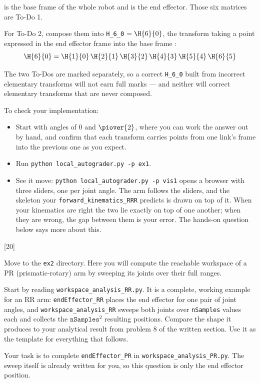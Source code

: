 \documentclass{16384_doc}
\begin{document}
\begin{questions}
 is the base frame of the whole robot and  is the end
effector. Those six matrices are To-Do 1.

For To-Do 2, compose them into \verb!H_6_0! $= \H{6}{0}$, the transform taking a
point expressed in the end effector frame  into the base frame
:
\[
    \H{6}{0} = \H{1}{0}\,\H{2}{1}\,\H{3}{2}\,\H{4}{3}\,\H{5}{4}\,\H{6}{5}
\]

The two To-Dos are marked separately, so a correct \verb!H_6_0! built from
incorrect elementary transforms will not earn full marks --- and neither will
correct elementary transforms that are never composed.

To check your implementation:
\begin{itemize}
    \item Start with angles of $0$ and $\piover{2}$, where you can work the
        answer out by hand, and confirm that each transform carries points from
        one link's frame into the previous one as you expect.
    \item Run \verb!python local_autograder.py -p ex1!.
    \item See it move: \verb!python local_autograder.py -p vis1! opens a browser
        with three sliders, one per joint angle. The arm follows the sliders,
        and the skeleton your \verb!forward_kinematics_RRR! predicts is drawn on
        top of it. When your kinematics are right the two lie exactly on top of
        one another; when they are wrong, the gap between them is your error.
        The hands-on question below says more about this.
\end{itemize}

    [20]

Move to the \verb!ex2! directory. Here you will compute the reachable workspace
of a PR (prismatic-rotary) arm by sweeping its joints over their full ranges.

Start by reading \verb!workspace_analysis_RR.py!. It is a complete, working
example for an RR arm: \verb!endEffector_RR! places the end effector for one
pair of joint angles, and \verb!workspace_analysis_RR! sweeps both joints over
\verb!nSamples! values each and collects the $\mathtt{nSamples}^2$ resulting
positions. Compare the shape it produces to your analytical result from problem
8 of the written section. Use it as the template for everything that follows.

Your task is to complete \verb!endEffector_PR! in
\verb!workspace_analysis_PR.py!. The sweep itself is already written for you, so
this question is only the end effector position.


\end{questions}
\end{document}
